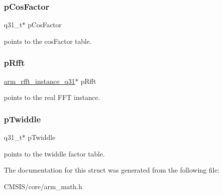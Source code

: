 \subsubsection{\texorpdfstring{p\+Cos\+Factor}{pCosFactor}}
{\footnotesize\ttfamily q31\+\_\+t$\ast$ p\+Cos\+Factor}

points to the cos\+Factor table. \mbox{\label{structarm__dct4__instance__q31_a16c74f8496e1691e62da3c57e0c676eb}} 
\subsubsection{\texorpdfstring{p\+Rfft}{pRfft}}
{\footnotesize\ttfamily \hyperlink{structarm__rfft__instance__q31}{arm\+\_\+rfft\+\_\+instance\+\_\+q31}$\ast$ p\+Rfft}

points to the real F\+FT instance. \mbox{\label{structarm__dct4__instance__q31_a2505b7d5ec077b244c712797a5253b6d}} 
\subsubsection{\texorpdfstring{p\+Twiddle}{pTwiddle}}
{\footnotesize\ttfamily q31\+\_\+t$\ast$ p\+Twiddle}

points to the twiddle factor table. 

The documentation for this struct was generated from the following file\+:\begin{DoxyCompactItemize}
\item 
C\+M\+S\+I\+S/core/arm\+\_\+math.\+h\end{DoxyCompactItemize}
